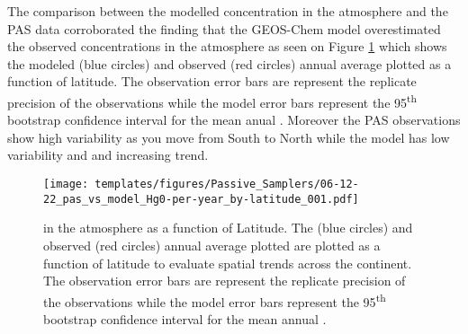 \begin{flushleft}
 The comparison between the modelled concentration in the atmosphere and the PAS data corroborated the finding that the GEOS-Chem model overestimated the observed concentrations in the atmosphere as seen on Figure \ref{fig:06-12-22_pas_vs_model_Hg0-per-year_by-latitude_001} which shows the modeled (blue circles) and observed (red circles) annual average \hg plotted as a function of latitude. The observation error bars are represent the replicate precision of the observations while the model error bars represent the 95\textsuperscript{th} bootstrap confidence interval for the mean anual \hg. Moreover the PAS observations show high variability as you move from South to North while the model has low variability and and increasing trend.  
\end{flushleft}

\begin{figure}[H]
  \texttt{[image: templates/figures/Passive\_Samplers/06-12-22\_pas\_vs\_model\_Hg0-per-year\_by-latitude\_001.pdf]}
  \caption{\hg in the atmosphere as a function of Latitude. The \on (blue circles) and observed (red circles) annual average \hg plotted are plotted as a function of latitude to evaluate spatial trends across the continent. The observation error bars are represent the replicate precision of the observations while the model error bars represent the 95\textsuperscript{th} bootstrap confidence interval for the mean annual \hg.}
  \label{fig:06-12-22_pas_vs_model_Hg0-per-year_by-latitude_001}
  \centering
  
\end{figure}
\FloatBarrier

